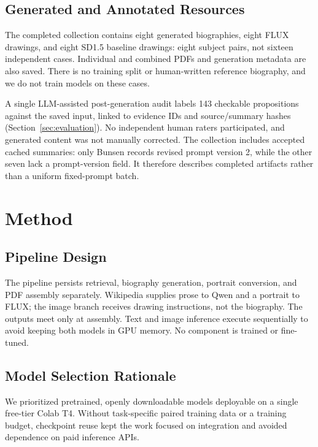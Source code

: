 \documentclass[11pt]{article}
\begin{document}
\subsection{Generated and Annotated Resources}

The completed collection contains eight generated biographies, eight FLUX drawings, and eight SD1.5 baseline drawings: eight subject pairs, not sixteen independent cases. Individual and combined PDFs and generation metadata are also saved. There is no training split or human-written reference biography, and we do not train models on these cases.

A single LLM-assisted post-generation audit labels 143 checkable propositions against the saved input, linked to evidence IDs and source/summary hashes (Section~\ref{sec:evaluation}). No independent human raters participated, and generated content was not manually corrected. The collection includes accepted cached summaries: only Bunsen records revised prompt version 2, while the other seven lack a prompt-version field. It therefore describes completed artifacts rather than a uniform fixed-prompt batch.

\section{Method}
\label{sec:method}

\subsection{Pipeline Design}

The pipeline persists retrieval, biography generation, portrait conversion, and PDF assembly separately. Wikipedia supplies prose to Qwen and a portrait to FLUX; the image branch receives drawing instructions, not the biography. The outputs meet only at assembly. Text and image inference execute sequentially to avoid keeping both models in GPU memory. No component is trained or fine-tuned.

\subsection{Model Selection Rationale}

We prioritized pretrained, openly downloadable models deployable on a single free-tier Colab T4. Without task-specific paired training data or a training budget, checkpoint reuse kept the work focused on integration and avoided dependence on paid inference APIs.
\end{document}
